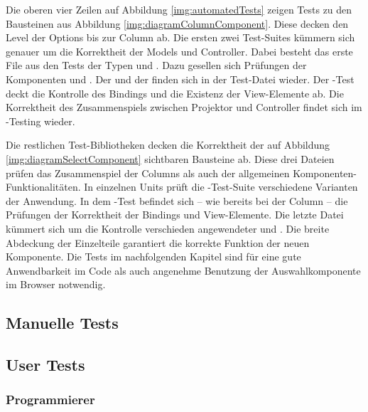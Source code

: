 Die oberen vier Zeilen auf Abbildung \ref{img:automatedTests} zeigen Tests zu den Bausteinen aus Abbildung \ref{img:diagramColumnComponent}. 
Diese decken den Level der Options bis zur Column ab. 
Die ersten zwei Test-Suites kümmern sich genauer um die Korrektheit der Models und Controller. 
Dabei besteht das erste File aus den Tests der Typen  und . 
Dazu gesellen sich Prüfungen der Komponenten  und . 
Der  und der  finden sich in der Test-Datei wieder. 
Der -Test deckt die Kontrolle des Bindings und die Existenz der View-Elemente ab. 
Die Korrektheit des Zusammenspiels zwischen Projektor und Controller findet sich im -Testing wieder. 

Die restlichen Test-Bibliotheken decken die Korrektheit der auf Abbildung \ref{img:diagramSelectComponent} sichtbaren Bausteine ab. 
Diese drei Dateien prüfen das Zusammenspiel der Columns als auch der allgemeinen Komponenten-Funktionalitäten. 
In einzelnen Units prüft die -Test-Suite verschiedene Varianten der Anwendung. 
In dem -Test befindet sich – wie bereits bei der Column – die Prüfungen der Korrektheit der Bindings und View-Elemente. 
Die letzte Datei kümmert sich um die Kontrolle verschieden angewendeter  und . 
Die breite Abdeckung der Einzelteile garantiert die korrekte Funktion der neuen Komponente. 
Die Tests im nachfolgenden Kapitel sind für eine gute Anwendbarkeit im Code als auch angenehme Benutzung der Auswahlkomponente im Browser notwendig. 


\subsection{Manuelle Tests}
\label{sec:manuelTests}

% 


\subsection{User Tests} %
\label{sec:userTests}



\subsubsection{Programmierer}
\label{sec:userTestsProgrammer}

